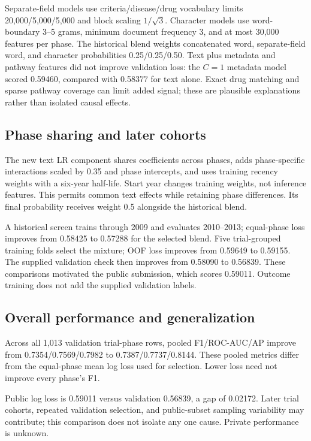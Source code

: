 Separate-field models use criteria/disease/drug vocabulary limits 20,000/5,000/5,000 and block
scaling $1/\sqrt{3}$. Character models use word-boundary 3--5 grams, minimum document frequency 3,
and at most 30,000 features per phase. The historical blend weights concatenated word,
separate-field word, and character probabilities 0.25/0.25/0.50. Text plus metadata and pathway
features did not improve validation loss: the $C=1$ metadata model scored 0.59460, compared with
0.58377 for text alone. Exact drug matching and sparse pathway coverage can limit added signal;
these are plausible explanations rather than isolated causal effects.

\subsection{Phase sharing and later cohorts}
The new text LR component shares coefficients across phases, adds phase-specific interactions
scaled by 0.35 and phase intercepts, and uses training recency weights with a six-year half-life.
Start year changes training weights, not inference features. This permits common text effects
while retaining phase differences. Its final probability receives weight 0.5 alongside the
historical blend.

A historical screen trains through 2009 and evaluates 2010--2013; equal-phase loss improves
from 0.58425 to 0.57288 for the selected blend. Five trial-grouped training folds select the
mixture; OOF loss improves from 0.59649 to 0.59155. The supplied validation check then improves
from 0.58090 to 0.56839. These comparisons motivated the public submission, which scores
0.59011. Outcome training does not add the supplied validation labels.

\subsection{Overall performance and generalization}
Across all 1,013 validation trial-phase rows, pooled F1/ROC-AUC/AP improve from
0.7354/0.7569/0.7982 to 0.7387/0.7737/0.8144. These pooled metrics differ from the
equal-phase mean log loss used for selection. Lower loss need not improve every phase's F1.

Public log loss is 0.59011 versus validation 0.56839, a gap of 0.02172.
Later trial cohorts, repeated validation selection, and public-subset sampling variability
may contribute; this comparison does not isolate any one cause. Private performance is unknown.
